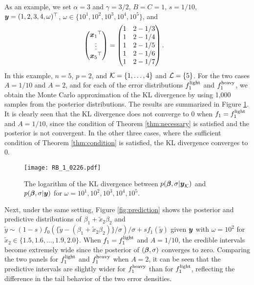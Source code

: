 \documentclass[12pt]{article}
\def\si{{\sigma}}
\def\al{{\alpha}}
\def\be{{\beta}}
\def\ga{{\gamma}}
\def\si{{\sigma}}
\def\om{{\omega}}
\def\non{{\nonumber}}
\def\Lc{{\cal L}}
\def\Kc{{\cal K}}
\def\xt{{\tilde x}}
\def\al{{\alpha}}
\def\be{{\beta}}
\def\ga{{\gamma}}
\def\si{{\sigma}}
\def\om{{\omega}}
\def\bbe{{\text{\boldmath $\beta$}}}
\def\x{{\text{\boldmath $x$}}}
\def\y{{\text{\boldmath $y$}}}
\def\yt{{\tilde y}}
\def\Lc{{\cal L}}
\def\Kc{{\cal K}}
\def\non{{\nonumber}}
\begin{document}
%
As an example, we set $\al = 3$ and $%
%
\ga = 3 / 2
$, $B = C = 1$, $s = 1 / 10$, $\y = (1, 2, 3, 4, \om )^{\top }$, $\om \in \{ 10^1, 10^2, 10^3, 10^4, 10^5 \} $, and 
\begin{align}
\begin{pmatrix} {\x _1}^{\top } \\ \vdots \\ {\x _5}^{\top } \end{pmatrix} &= \begin{pmatrix} 1 & 2 - 1 / 3 \\ 1 & 2 - 1 / 4 \\ 1 & 2 - 1 / 5 \\ 1 & 2 - 1 / 6 \\ 1 & 2 - 1 / 7 \end{pmatrix} \text{.} \non 
\end{align}
In this example, $n = 5$, $p = 2$, and $\Kc = \{ 1, \dots , 4 \} $ and $\Lc = \{ 5 \} $. 
%
For the two cases $A = 1 / 10$ and $A = 2$, and for each of the error distributions $f_{1}^{\rm{light}}$ and $f_{1}^{\rm{heavy}}$, we obtain %
the Monte Carlo approximation of the KL divergence by using 1,000 samples from the posterior distributions. 
The results are summarized in Figure \ref{fig:KL}. 
It is clearly seen that the KL divergence does not converge to $0$ when $f_1 = f_{1}^{\rm{light}}$ and $A = 1 / 10$, 
since the condition of Theorem \ref{thm:necessary} is satisfied and the posterior is not convergent. 
In the other three cases, where the sufficient condition of Theorem \ref{thm:condition} is satisfied, the KL divergence converges to $0$. 

\begin{figure}[H]%
\centering
\texttt{[image: RB\_1\_0226.pdf]}
\caption{The logarithm of the KL divergence between $p( \bbe , \si | \y _{\Kc } )$ and $p( \bbe , \si | \y )$ for $\om = 10^1, 10^2 , 10^3 , 10^4 , 10^5$. }
\label{fig:KL} 
\end{figure}%



Next, under the same setting, Figure \ref{fig:prediction} shows the posterior and predictive distributions of $\be _1 + \xt _2 \be _2$ and $\yt \sim (1 - s) f_0 ( \{ \yt - ( \be _1 + \xt _2 \be _2 ) \} / \si ) / \si + s f_1 ( \yt )$ given $\y $ with $\om = 10^2$ for $\xt _2 \in \{ 1.5, 1.6, \dots , 1.9, 2.0\}$. 
When $f_1 = f_{1}^{\rm{light}}$ and $A = 1 / 10$, the credible intervals become extremely wide since the posterior of $(\bbe,\si)$ converges to zero. 
Comparing the two panels for $f_{1}^{\rm{light}}$ and $f_{1}^{\rm{heavy}}$ when $A = 2$, it can be seen that the predictive intervals %
are 
%
slightly wider for $f_{1}^{\rm{heavy}}$ than for $f_{1}^{\rm{light}}$, reflecting the difference in the tail behavior of the two error densities. 
\end{document}
